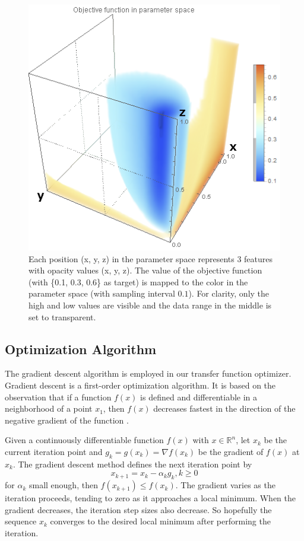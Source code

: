 \begin{figure}
	\centering
	\begin{minipage}{.6\textwidth}
		\includegraphics[width=1\linewidth]{images/nucleon_strong_red_parameterspace}
	\end{minipage}
	\caption{Each position (x, y, z) in the parameter space represents 3 features with opacity values (x, y, z). The value of the objective function (with \{0.1, 0.3, 0.6\} as target) is mapped to the color in the parameter space (with sampling interval $ 0.1 $). For clarity, only the high and low values are visible and the data range in the middle is set to transparent.}
	\label{fig:nucleon_parameterspace}
\end{figure}

\subsection{Optimization Algorithm}
The gradient descent algorithm is employed in our transfer function optimizer.
Gradient descent is a first-order optimization algorithm. It is based on the observation that if a function $ f(x) $ is defined and differentiable in a neighborhood of a point $ x_{1} $, then $ f(x) $ decreases fastest in the direction of the negative gradient of the function \cite{chong_introduction_2013}.

Given a continuously differentiable function $ f(x) $ with $ x \in \mathbb{R}^{n} $, let $ x_{k} $ be the current iteration point and $ g_{k}=g(x_{k})= \nabla f(x_{k}) $ be the gradient of $ f(x) $ at $ x_{k} $. The gradient descent method defines the next iteration point by
\[ x_{k+1}=x_{k}- \alpha_{k} g_{k} , k \geq 0 \]
for $ \alpha_{k} $ small enough, then $ f(x_{k+1}) \leq f(x_{k}) $. The gradient varies as the iteration proceeds, tending to zero as it approaches a local minimum. When the gradient decreases, the iteration step sizes also decrease. So hopefully the sequence $ {x_{k}} $ converges to the desired local minimum after performing the iteration.

